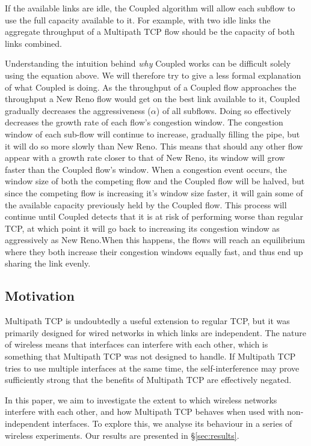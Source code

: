 If the available links are idle, the Coupled algorithm will allow each subflow to
use the full capacity available to it. For example, with two idle links the aggregate
throughput of a Multipath TCP flow should be the capacity of both links combined.

Understanding the intuition behind \textit{why} Coupled works can be difficult
solely using the equation above. We will therefore try to give a less formal
 explanation of what Coupled is doing. As the throughput of a Coupled
flow approaches the throughput a New Reno flow would get on the best link
available to it, Coupled gradually decreases the aggressiveness ($\alpha$)
of all subflows. Doing so effectively decreases the growth rate of each flow's
congestion window. The congestion window of each sub-flow will continue to increase,
gradually filling the pipe, but it will do so more slowly than New Reno. This means that
should any other flow appear with a growth rate closer to that of New Reno, its
window will grow faster than the Coupled flow's window. When a congestion event
occurs, the window size of both the competing flow and the Coupled
flow will be halved, but since the competing flow is increasing it's window size faster,
it will gain some of the available capacity previously held by the Coupled flow.
This process will continue until Coupled detects that it is at risk of
performing worse than regular TCP, at which point it will go back to increasing its
congestion window as aggressively as New Reno.\@ When this happens, the flows will
reach an equilibrium where they both increase their congestion windows equally
fast, and thus end up sharing the link evenly.

\subsection{Motivation}
\label{sec:bg:motivation}
Multipath TCP is undoubtedly a useful extension to regular TCP, but it was
primarily designed for wired networks in which links are independent.
The nature of wireless means that interfaces can interfere with each
other, which is something that Multipath TCP was not designed to handle.
If Multipath TCP
tries to use multiple interfaces at the same time, the self-interference may
prove sufficiently strong that the benefits of Multipath TCP are effectively
negated.

In this paper, we aim to investigate the extent to which wireless networks
interfere with each other, and how Multipath TCP behaves when used with
non-independent interfaces. To explore this, we analyse its behaviour in a
series of wireless experiments. Our results are presented in
\S\ref{sec:results}.
